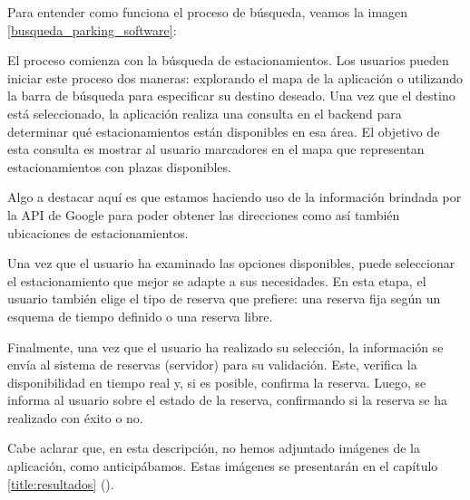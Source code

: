 Para entender como funciona el proceso de búsqueda, veamos la imagen \ref{busqueda_parking_software}:


El proceso comienza con la búsqueda de estacionamientos. Los usuarios pueden iniciar este proceso dos maneras: explorando el mapa de la aplicación o utilizando la barra de búsqueda para especificar su destino deseado. Una vez que el destino está seleccionado, la aplicación realiza una consulta en el backend para determinar qué estacionamientos están disponibles en esa área. El objetivo de esta consulta es mostrar al usuario marcadores en el mapa que representan estacionamientos con plazas disponibles.

Algo a destacar aquí es que estamos haciendo uso de la información brindada por la API de Google para poder obtener las direcciones como así también ubicaciones de estacionamientos.

Una vez que el usuario ha examinado las opciones disponibles, puede seleccionar el estacionamiento que mejor se adapte a sus necesidades. En esta etapa, el usuario también elige el tipo de reserva que prefiere: una reserva fija según un esquema de tiempo definido o una reserva libre.

Finalmente, una vez que el usuario ha realizado su selección, la información se envía al sistema de reservas (servidor) para su validación. Este, verifica la disponibilidad en tiempo real y, si es posible, confirma la reserva. Luego, se informa al usuario sobre el estado de la reserva, confirmando si la reserva se ha realizado con éxito o no.

Cabe aclarar que, en esta descripción, no hemos adjuntado imágenes de la aplicación, como anticipábamos. Estas imágenes se presentarán en el capítulo \ref{title:resultados} ().
